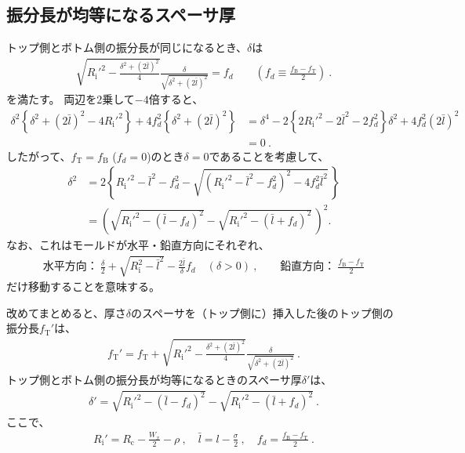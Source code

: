 \subsection{振分長が均等になるスペーサ厚}
トップ側とボトム側の振分長が同じになるとき、$\delta$は
\begin{align*}
  \sqrt{R_\mathrm i'^2-\frac{\delta^2+(2\bar l)^2}4}\frac\delta{\sqrt{\delta^2+(2\bar l)^2}} = f_d \qquad
  \left(f_d \equiv \frac{f_\mathrm B-f_\mathrm T}2\right)\ .
\end{align*}
を満たす。
両辺を2乗して$-4$倍すると、
\begin{align*}
  \delta^2\left\{\delta^2+(2\bar l)^2-4R_\mathrm i'^2\right\}+4f_d^2\left\{\delta^2+(2\bar l)^2\right\}
  & = \delta^4-2\left\{2R_\mathrm i'^2-2\bar l^2-2f_d^2\right\}\delta^2+4f_d^2(2\bar l)^2\\
  & = 0\ .
\end{align*}
したがって、$f_\mathrm T = f_\mathrm B$ ($f_d = 0$)のとき$\delta = 0$であることを考慮して、
\begin{align*}
  \delta^2
  &= 2\left\{
       R_\mathrm i'^2-\bar l^2-f_d^2-\sqrt{\left(R_\mathrm i'^2-\bar l^2-f_d^2\right)^2-4f_d^2\bar l^2}\,
     \right\}\\
  &= \left(\sqrt{R_\mathrm i'^2-(\bar l-f_d)^2}-\sqrt{R_\mathrm i'^2-(\bar l+f_d)^2}\,\right)^{\!\!2}.
\end{align*}
なお、これはモールドが水平・鉛直方向にそれぞれ、
\begin{align*}
  \text{水平方向：}~\frac\delta2+\sqrt{R_\mathrm i^2-\bar l^2}-\frac{2\bar l}{\delta}f_d\quad(\delta>0)\ , \qquad
  \text{鉛直方向：}~\frac{f_\mathrm B-f_\mathrm T}2
\end{align*}
だけ移動することを意味する。


\begin{hosoku}
改めてまとめると、厚さ$\delta$のスペーサを（トップ側に）挿入した後のトップ側の振分長$f_\mathrm T'$は、
\begin{align*}
  f_\mathrm T'
  = f_\mathrm T+\sqrt{R_\mathrm i'^2-\frac{\delta^2+(2\bar l)^2}4}\frac\delta{\sqrt{\delta^2+(2\bar l)^2}}\ .
\end{align*}
トップ側とボトム側の振分長が均等になるときのスペーサ厚$\delta'$は、
\begin{align*}
  \delta' = \sqrt{R_\mathrm i'^2-(\bar l-f_d)^2}-\sqrt{R_\mathrm i'^2-(\bar l+f_d)^2}\ .
\end{align*}
ここで、
\begin{align*}
  R_\mathrm i' = R_\mathrm c-\frac{W_x}2-\rho\ ,\quad
  \bar l = l-\frac\sigma2\ ,\quad
  f_d = \frac{f_\mathrm B-f_\mathrm T}2\ .
\end{align*}
\end{hosoku}




